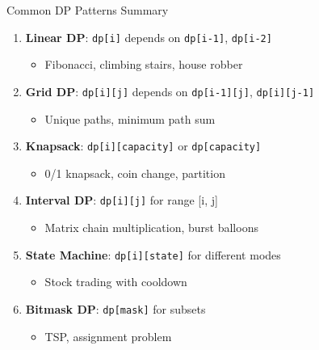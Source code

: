 \documentclass[aspectratio=169]{beamer}
\begin{document}
\begin{frame}{Common DP Patterns Summary}
  \begin{enumerate}
    \item \textbf{Linear DP}: \texttt{dp[i]} depends on \texttt{dp[i-1]}, \texttt{dp[i-2]}
    \begin{itemize}
      \item Fibonacci, climbing stairs, house robber
    \end{itemize}

    \item \textbf{Grid DP}: \texttt{dp[i][j]} depends on \texttt{dp[i-1][j]}, \texttt{dp[i][j-1]}
    \begin{itemize}
      \item Unique paths, minimum path sum
    \end{itemize}

    \item \textbf{Knapsack}: \texttt{dp[i][capacity]} or \texttt{dp[capacity]}
    \begin{itemize}
      \item 0/1 knapsack, coin change, partition
    \end{itemize}

    \item \textbf{Interval DP}: \texttt{dp[i][j]} for range [i, j]
    \begin{itemize}
      \item Matrix chain multiplication, burst balloons
    \end{itemize}

    \item \textbf{State Machine}: \texttt{dp[i][state]} for different modes
    \begin{itemize}
      \item Stock trading with cooldown
    \end{itemize}

    \item \textbf{Bitmask DP}: \texttt{dp[mask]} for subsets
    \begin{itemize}
      \item TSP, assignment problem
    \end{itemize}
  \end{enumerate}
\end{frame}
\end{document}

